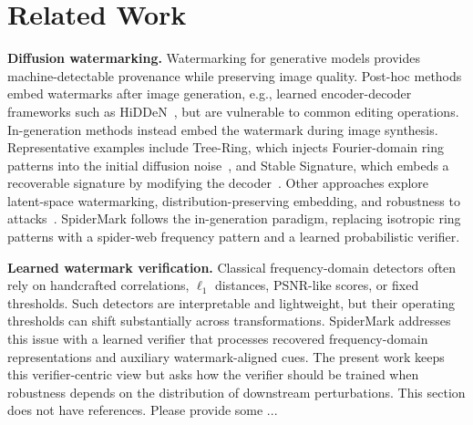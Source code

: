 \section{Related Work}
\label{sec:related}

{\bf Diffusion watermarking.}
Watermarking for generative models provides machine-detectable provenance while preserving image quality. Post-hoc methods embed watermarks after image generation, e.g., learned encoder-decoder frameworks such as HiDDeN~\cite{zhu2018hidden}, but are vulnerable to common editing operations. In-generation methods instead embed the watermark during image synthesis. Representative examples include Tree-Ring, which injects Fourier-domain ring patterns into the initial diffusion noise~\cite{wen2023tree_ring}, and Stable Signature, which embeds a recoverable signature by modifying the decoder~\cite{fernandez2023stable}. Other approaches explore latent-space watermarking, distribution-preserving embedding, and robustness to attacks~\cite{zhang2024attack,yang2024gaussian,huang2024robin}. SpiderMark follows the in-generation paradigm, replacing isotropic ring patterns with a spider-web frequency pattern and a learned probabilistic verifier.

{\bf Learned watermark verification.}
Classical frequency-domain detectors often rely on handcrafted correlations, $\ell_1$ distances, PSNR-like scores, or fixed thresholds.
Such detectors are interpretable and lightweight, but their operating thresholds can shift substantially across transformations.
SpiderMark addresses this issue with a learned verifier that processes recovered frequency-domain representations and auxiliary watermark-aligned cues.
The present work keeps this verifier-centric view but asks how the verifier should be trained when robustness depends on the distribution of downstream perturbations.
{\color{red} This section does not have references. Please provide some ... }

